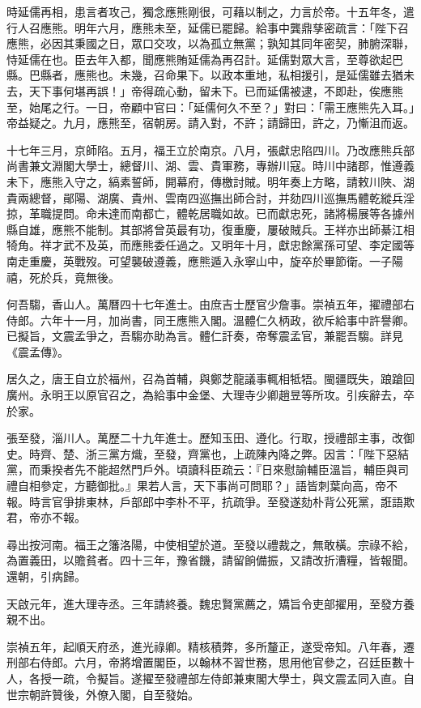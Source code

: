 \begin{pinyinscope}
時延儒再相，患言者攻己，獨念應熊剛很，可藉以制之，力言於帝。十五年冬，遣行人召應熊。明年六月，應熊未至，延儒已罷歸。給事中龔鼎孳密疏言：「陛下召應熊，必因其秉國之日，眾口交攻，以為孤立無黨；孰知其同年密契，肺腑深聯，恃延儒在也。臣去年入都，聞應熊賄延儒為再召計。延儒對眾大言，至尊欲起巴縣。巴縣者，應熊也。未幾，召命果下。以政本重地，私相援引，是延儒雖去猶未去，天下事何堪再誤！」帝得疏心動，留未下。已而延儒被逮，不即赴，俟應熊至，始尾之行。一日，帝顧中官曰：「延儒何久不至？」對曰：「需王應熊先入耳。」帝益疑之。九月，應熊至，宿朝房。請入對，不許；請歸田，許之，乃慚沮而返。

十七年三月，京師陷。五月，福王立於南京。八月，張獻忠陷四川。乃改應熊兵部尚書兼文淵閣大學士，總督川、湖、雲、貴軍務，專辦川寇。時川中諸郡，惟遵義未下，應熊入守之，縞素誓師，開幕府，傳檄討賊。明年奏上方略，請敕川陜、湖貴兩總督，鄖陽、湖廣、貴州、雲南四巡撫出師合討，并劾四川巡撫馬體乾縱兵淫掠，革職提問。命未達而南都亡，體乾居職如故。已而獻忠死，諸將楊展等各據州縣自雄，應熊不能制。其部將曾英最有功，復重慶，屢破賊兵。王祥亦出師綦江相犄角。祥才武不及英，而應熊委任過之。又明年十月，獻忠餘黨孫可望、李定國等南走重慶，英戰歿。可望襲破遵義，應熊遁入永寧山中，旋卒於畢節衛。一子陽禧，死於兵，竟無後。

何吾騶，香山人。萬曆四十七年進士。由庶吉士歷官少詹事。崇禎五年，擢禮部右侍郎。六年十一月，加尚書，同王應熊入閣。溫體仁久柄政，欲斥給事中許譽卿。已擬旨，文震孟爭之，吾騶亦助為言。體仁訐奏，帝奪震孟官，兼罷吾騶。詳見《震孟傳》。

居久之，唐王自立於福州，召為首輔，與鄭芝龍議事輒相牴牾。閩疆既失，踉蹌回廣州。永明王以原官召之，為給事中金堡、大理寺少卿趙昱等所攻。引疾辭去，卒於家。

張至發，淄川人。萬歷二十九年進士。歷知玉田、遵化。行取，授禮部主事，改御史。時齊、楚、浙三黨方熾，至發，齊黨也，上疏陳內降之弊。因言：「陛下惡結黨，而秉揆者先不能超然門戶外。頃讀科臣疏云：『日來慰諭輔臣溫旨，輔臣與司禮自相參定，方聽御批。』果若人言，天下事尚可問耶？」語皆刺葉向高，帝不報。時言官爭排東林，戶部郎中李朴不平，抗疏爭。至發遂劾朴背公死黨，誑語欺君，帝亦不報。

尋出按河南。福王之籓洛陽，中使相望於道。至發以禮裁之，無敢橫。宗祿不給，為置義田，以贍貧者。四十三年，豫省饑，請留餉備振，又請改折漕糧，皆報聞。還朝，引病歸。

天啟元年，進大理寺丞。三年請終養。魏忠賢黨薦之，矯旨令吏部擢用，至發方養親不出。

崇禎五年，起順天府丞，進光祿卿。精核積弊，多所釐正，遂受帝知。八年春，遷刑部右侍郎。六月，帝將增置閣臣，以翰林不習世務，思用他官參之，召廷臣數十人，各授一疏，令擬旨。遂擢至發禮部左侍郎兼東閣大學士，與文震孟同入直。自世宗朝許贊後，外僚入閣，自至發始。


\end{pinyinscope}
